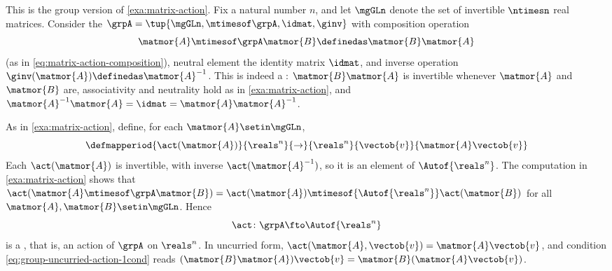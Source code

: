 

\begin{example}
    \label{exa:matrix-group-action}
    This is the group version of \cref{exa:matrix-action}.
    Fix a natural number $n$, and let $\mgGLn$ denote the set of invertible $\ntimesn$ real matrices.
    Consider the  $\grpA = \tup{\mgGLn, \mtimesof\grpA, \idmat, \ginv}$ with composition operation
    \begin{equation}
        \matmor{A} \mtimesof\grpA \matmor{B} \definedas \matmor{B} \matmor{A}
    \end{equation}
    (as in \cref{eq:matrix-action-composition}), neutral element the identity matrix $\idmat$, and inverse operation $\ginv(\matmor{A}) \definedas \matmor{A}^{-1}$.
    This is indeed a : $\matmor{B}\matmor{A}$ is invertible whenever $\matmor{A}$ and $\matmor{B}$ are, associativity and neutrality hold as in \cref{exa:matrix-action}, and $\matmor{A}^{-1}\matmor{A} = \idmat = \matmor{A}\matmor{A}^{-1}$.

    As in \cref{exa:matrix-action}, define, for each $\matmor{A} \setin \mgGLn$,
    \begin{equation}
        \defmapperiod{\act(\matmor{A})}{\reals^n}{\to}{\reals^n}{\vectob{v}}{\matmor{A}\vectob{v}}
    \end{equation}
    Each $\act(\matmor{A})$ is invertible, with inverse $\act(\matmor{A}^{-1})$, so it is an element of $\Autof{\reals^n}$.
    The computation in \cref{exa:matrix-action} shows that $\act(\matmor{A} \mtimesof\grpA \matmor{B}) = \act(\matmor{A}) \mtimesof{\Autof{\reals^n}} \act(\matmor{B})$ for all $\matmor{A}, \matmor{B} \setin \mgGLn$.
    Hence
    \begin{equation}
        \act \colon \grpA \fto \Autof{\reals^n}
    \end{equation}
    is a , that is, an action of $\grpA$ on $\reals^n$.
    In uncurried form, $\act(\matmor{A}, \vectob{v}) = \matmor{A}\vectob{v}$, and condition \cref{eq:group-uncurried-action-1cond} reads $(\matmor{B}\matmor{A})\vectob{v} = \matmor{B}(\matmor{A}\vectob{v})$.
\end{example}


